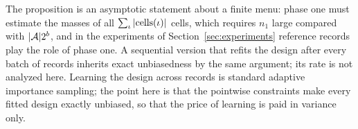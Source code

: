 The proposition is an asymptotic statement about a finite menu: phase one
must estimate the masses of all $\sum_\iota|{\rm cells}(\iota)|$ cells, which
requires $n_1$ large compared with $|\mathcal A|2^b$, and in the experiments of
Section~\ref{sec:experiments} reference records play the role of phase one.
A sequential version that refits the design after every batch of records
inherits exact unbiasedness by the same argument; its rate is not analyzed
here. Learning the design across records is standard adaptive importance
sampling; the point here is that the pointwise constraints make every fitted
design exactly unbiased, so that the price of learning is paid in variance
only.
